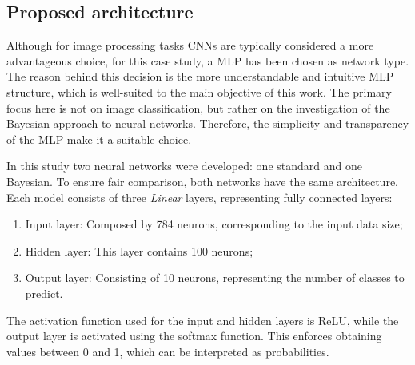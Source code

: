 \subsection{Proposed architecture}

Although for image processing tasks CNNs are typically considered a more advantageous choice, for this case study, a MLP has been chosen as network type. The reason behind this decision is the more understandable and intuitive MLP structure, which is well-suited to the main objective of this work. The primary focus here is not on image classification, but rather on the investigation of the Bayesian approach to neural networks. Therefore, the simplicity and transparency of the MLP make it a suitable choice.

In this study two neural networks were developed: one standard and one Bayesian. To ensure fair comparison, both networks have the same architecture. Each model consists of three \textit{Linear} layers, representing fully connected layers:

\begin{enumerate}
	\item Input layer: Composed by 784 neurons, corresponding to the input data size;
	\item Hidden layer: This layer contains 100 neurons;
	\item Output layer: Consisting of 10 neurons, representing the number of classes to predict.
\end{enumerate}

The activation function used for the input and hidden layers is ReLU, while the output layer is activated using the softmax function. This enforces obtaining values between 0 and 1, which can be interpreted as probabilities.